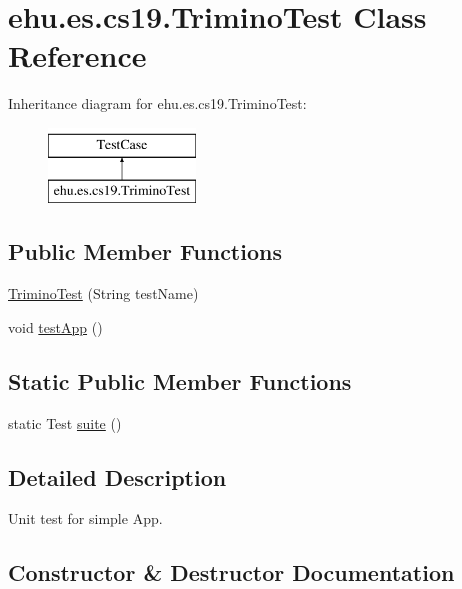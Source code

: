 \hypertarget{classehu_1_1es_1_1cs19_1_1_trimino_test}{}\section{ehu.\+es.\+cs19.\+Trimino\+Test Class Reference}
\label{classehu_1_1es_1_1cs19_1_1_trimino_test}
Inheritance diagram for ehu.\+es.\+cs19.\+Trimino\+Test\+:\begin{figure}[H]
\begin{center}
\leavevmode
\includegraphics[height=2.000000cm]{classehu_1_1es_1_1cs19_1_1_trimino_test}
\end{center}
\end{figure}
\subsection*{Public Member Functions}
\begin{DoxyCompactItemize}
\item 
\mbox{\hyperlink{classehu_1_1es_1_1cs19_1_1_trimino_test_aaa76d61c8727483d1122f74c9aecda8d}{Trimino\+Test}} (String test\+Name)
\item 
void \mbox{\hyperlink{classehu_1_1es_1_1cs19_1_1_trimino_test_ad203e30535b73e709d8cf66d6bf10150}{test\+App}} ()
\end{DoxyCompactItemize}
\subsection*{Static Public Member Functions}
\begin{DoxyCompactItemize}
\item 
static Test \mbox{\hyperlink{classehu_1_1es_1_1cs19_1_1_trimino_test_a5fa898ccd2031e659b10ae19317c15a5}{suite}} ()
\end{DoxyCompactItemize}


\subsection{Detailed Description}
Unit test for simple App. 

\subsection{Constructor \& Destructor Documentation}
\mbox{\label{classehu_1_1es_1_1cs19_1_1_trimino_test_aaa76d61c8727483d1122f74c9aecda8d}} 
